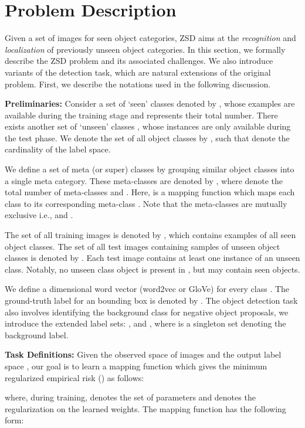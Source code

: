\documentclass[runningheads]{llncs}
\begin{document}
\section{Problem Description} \vspace{-0.5em}
Given a set of images for seen object categories, ZSD aims at the \emph{recognition} and \emph{localization} of previously unseen object categories. In this section, we formally describe the ZSD problem and its associated challenges. We also introduce variants of the detection task, which are natural extensions of the original problem. First, we describe the notations used in the following discussion. 

\textbf{Preliminaries:}
Consider a set of `seen' classes denoted by , whose examples are available during the training stage and    represents their total number. There exists another set of `unseen' classes , whose instances are only available during the test phase. We denote the set of all object classes by , such that  denote the cardinality of the label space. 

We define a set of meta (or super) classes by grouping similar object classes into a single meta category. These meta-classes are  denoted by , where  denote the total number of meta-classes and .  Here,  is a mapping function which maps each class  to its corresponding meta-class . Note that the meta-classes are mutually exclusive i.e.,  and .

The set of all training images is denoted by , which contains examples of all seen object classes. The set of all test images containing samples of unseen object classes is denoted by . Each test image  contains at least one instance of an unseen class. Notably, no unseen class object is present in , but  may contain seen objects. 

We define a  dimensional word vector  (word2vec or GloVe)  for every class . The ground-truth label for an  bounding box is denoted by . The object detection task also involves identifying the background class for negative object proposals, we introduce the extended label sets: ,  and , where  is a singleton set denoting the background label.



\textbf{Task Definitions:}
Given the observed space of images  and the output label space , our goal is to learn a mapping function  which gives the minimum regularized empirical risk () as follows:

where,  during training,  denotes the set of parameters and  denotes the regularization on the learned weights. The mapping function has the following form:
\end{document}
